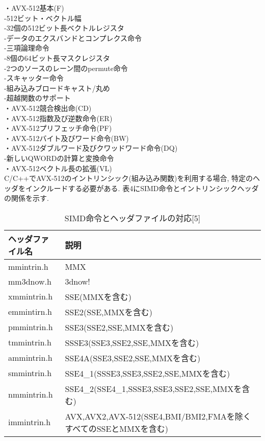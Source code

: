 \documentclass[11pt,a4paper]{jsreport}
\theoremstyle{definition}
\begin{document}
  ・AVX-512基本(F) \\
    \indent \indent -512ビット・ベクトル幅 \\
    \indent \indent -32個の512ビット長ベクトルレジスタ \\
    \indent \indent -データのエクスバンドとコンプレクス命令 \\
    \indent \indent -三項論理命令 \\
    \indent \indent -8個の64ビット長マスクレジスタ \\
    \indent \indent -2つのソースのレーン間のpermute命令 \\
    \indent \indent -スキャッター命令 \\
    \indent \indent -組み込みブロードキャスト/丸め \\
    \indent \indent -超越関数のサポート \\
\indent  ・AVX-512競合検出命(CD) \\
\indent ・AVX-512指数及び逆数命令(ER) \\
\indent  ・AVX-512プリフェッチ命令(PF) \\
\indent  ・AVX-512バイト及びワード命令(BW) \\
\indent  ・AVX-512ダブルワード及びクワッドワード命令(DQ) \\
\indent    \indent  -新しいQWORDの計算と変換命令 \\
\indent  ・AVX-512ベクトル長の拡張(VL) \\

\indent C/C++でAVX-512のイントリンシック(組み込み関数)を利用する場合, 特定のヘッダをインクルードする必要がある. 表4にSIMD命令とイントリンシックヘッダの関係を示す.

\begin{table}[h]
  \centering
  \caption{SIMD命令とヘッダファイルの対応[5]}
  \small
  \begin{tabular}{|l|l|}
  \hline
  ヘッダファイル名 & 説明 \\ \hline \hline
  mmintrin.h & MMX \\ \hline
  mm3dnow.h & 3dnow! \\ \hline
  xmmintrin.h & SSE(MMXを含む) \\ \hline
  emmintirn.h & SSE2(SSE,MMXを含む) \\ \hline
  pmmintrin.h & SSE3(SSE2,SSE,MMXを含む) \\ \hline
  tmmintrin.h & SSSE3(SSE3,SSE2,SSE,MMXを含む) \\ \hline
  ammintrin.h & SSE4A(SSE3,SSE2,SSE,MMXを含む) \\ \hline
  smmintrin.h & SSE4_1(SSSE3,SSE3,SSE2,SSE,MMXを含む) \\ \hline
  nmmintrin.h & SSE4_2(SSE4_1,SSSE3,SSE3,SSE2,SSE,MMXを含む) \\ \hline
  immintrin.h & AVX,AVX2,AVX-512(SSE4,BMI/BMI2,FMAを除くすべてのSSEとMMXを含む) \\ \hline
  \end{tabular}
\end{table}
\end{document}
